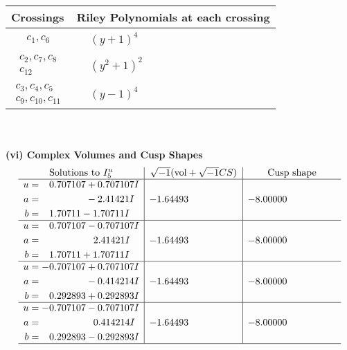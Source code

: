 \documentclass[1p]{elsarticle_modified}
\theoremstyle{definition}
\newcommand{\I}{\sqrt{-1}}
\begin{document}
\begin{tabular}{m{50pt}|m{274pt}}
Crossings & \hspace{64pt}Riley Polynomials at each crossing \\
\hline $$\begin{aligned}c_{1},c_{6}\end{aligned}$$&$\begin{aligned}
&(y+1)^4
\end{aligned}$\\
\hline $$\begin{aligned}c_{2},c_{7},c_{8}\\c_{12}\end{aligned}$$&$\begin{aligned}
&(y^2+1)^2
\end{aligned}$\\
\hline $$\begin{aligned}c_{3},c_{4},c_{5}\\c_{9},c_{10},c_{11}\end{aligned}$$&$\begin{aligned}
&(y-1)^4
\end{aligned}$\\
\hline
\end{tabular}\\~\\
\newpage\flushleft \textbf{(vi) Complex Volumes and Cusp Shapes}
$$\begin{array}{c|c|c}  
\text{Solutions to }I^u_{5}& \I (\text{vol} + \sqrt{-1}CS) & \text{Cusp shape}\\
 \hline 
\begin{aligned}
u &= \phantom{-}0.707107 + 0.707107 I \\
a &= \phantom{-0.000000 } -2.41421 I \\
b &= \phantom{-}1.70711 - 1.70711 I\end{aligned}
 & -1.64493\phantom{ +0.000000I} & -8.00000\phantom{ +0.000000I} \\ \hline\begin{aligned}
u &= \phantom{-}0.707107 - 0.707107 I \\
a &= \phantom{-0.000000 -}2.41421 I \\
b &= \phantom{-}1.70711 + 1.70711 I\end{aligned}
 & -1.64493\phantom{ +0.000000I} & -8.00000\phantom{ +0.000000I} \\ \hline\begin{aligned}
u &= -0.707107 + 0.707107 I \\
a &= \phantom{-0.000000 } -0.414214 I \\
b &= \phantom{-}0.292893 + 0.292893 I\end{aligned}
 & -1.64493\phantom{ +0.000000I} & -8.00000\phantom{ +0.000000I} \\ \hline\begin{aligned}
u &= -0.707107 - 0.707107 I \\
a &= \phantom{-0.000000 -}0.414214 I \\
b &= \phantom{-}0.292893 - 0.292893 I\end{aligned}
 & -1.64493\phantom{ +0.000000I} & -8.00000\phantom{ +0.000000I}\\
 \hline 
 \end{array}$$\newpage\newpage\renewcommand{\arraystretch}{1}
\end{document}
